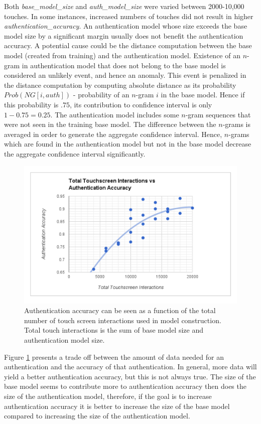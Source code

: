 \documentclass{acm_proc_article-sp}
\begin{document}
Both {\it base\_model\_size} and {\it auth\_model\_size} were varied between 2000-10,000 touches.
In some instances, 
increased numbers of touches did not result in higher\\
{\it authentication\_accuracy}.
An authentication model whose size exceeds the base model size by a significant margin usually
does not benefit the authentication accuracy.
%
A potential cause could be the distance computation 
between the base model (created from training) and the authentication model.
Existence of an $n$-gram in authentication model that does not belong to the base model
is considered an unlikely event, and hence an anomaly. 
This event is penalized in the distance computation
by computing absolute distance as its probability 
$Prob(NG[i, auth])$ - probability of an $n$-gram
$i$ in the base model.
Hence if this probability is $.75$, its contribution to
confidence interval is only $1-0.75=0.25$.
The authentication model includes some
$n$-gram sequences that were not seen in the training base model.
%
The difference between the $n$-grams is averaged
in order to generate the aggregate confidence interval.
Hence, $n$-grams which are found in the authentication model but not in the base model
decrease the aggregate confidence interval significantly.

\begin{figure}
\centering
\includegraphics[width=.45\textwidth]{authentication_accuracy_vs_total_interactions.pdf}
\caption{
Authentication accuracy can be seen as
a function of
the total number of touch screen interactions
used in model construction.
Total touch interactions is the sum of
base model size and authentication model size.
}
\label{fig:total_touches_vs_authentication_accuracy}
\end{figure}

Figure \ref{fig:total_touches_vs_authentication_accuracy} presents a trade off between the amount of data needed for an authentication and the accuracy of that authentication.
In general, more data will yield a better authentication accuracy, but this is not always true.
The size of the base model seems to contribute more to authentication accuracy then does the size of the authentication model, therefore, if the goal is to increase authentication accuracy it is better to increase the size of the base model compared to increasing the size of the authentication model.
\end{document}
